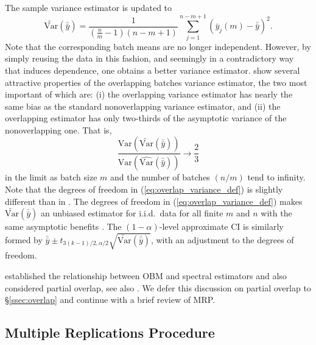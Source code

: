 \documentclass[12pt]{article}
\newcommand{\e}[1]{\mathbb{E} %
#1 %
}
\newcommand{\var}[1]{\mathrm{Var} \left( #1 \right)}
\newcommand{\vart}[1]{\widetilde{\mathrm{Var}} \left( #1 \right)}
\newcommand{\varhat}{\widehat{\mathrm{Var}}}
\newcommand{\X}{X}
\newcommand{\x}{x}
\newcommand{\xh}{{\hat{\x}}}
\newcommand{\xit}{\xi}
\newcommand{\zs}{z^*}
\newcommand{\yb}{\bar{y}}
\newcommand{\ybb}{\bar{\yb}}
\begin{document}
The sample variance estimator is updated to
\begin{equation} \label{eq:overlap_variance_def}
	\vart{\ybb} = \frac{1}{(\tfrac{n}{m}-1)(n - m + 1)}\sum_{j=1}^{n-m+1} (\yb_j(m) - \ybb)^2.
\end{equation}
Note that the corresponding batch means are no longer independent. 
However, by simply reusing the data in this fashion, and seemingly in a contradictory way that induces dependence, one obtains a better variance estimator. 
\citet{Meketon1984} show several attractive properties of the overlapping batches variance estimator, the two most important of which are: (i) the overlapping variance estimator has nearly the same bias as the standard nonoverlapping variance estimator, and (ii) the overlapping estimator has only two-thirds of the asymptotic variance of the nonoverlapping one.  
That is, 
\begin{equation} \label{eq:asym_var}
	\frac{ \var{\vart{\ybb}} }{ \var{\varhat(\ybb)} } \rightarrow \frac{2}{3}
\end{equation}
in the limit as batch size $m$ and the number of batches $(n/m)$ tend to infinity.  
Note that the degrees of freedom in (\ref{eq:overlap_variance_def}) is slightly different than in \citep{Meketon1984}.  
The degrees of freedom in (\ref{eq:overlap_variance_def}) makes $\vart{\ybb}$ an unbiased estimator for i.i.d.\ data for all finite $m$ and $n$ with the same asymptotic benefits \citep{Song1992}.  
The $(1-\alpha)$-level approximate CI is similarly formed by $\ybb \pm t_{3(k-1)/2,\alpha/2} \sqrt{\vart{\ybb}}$, with an adjustment to the degrees of freedom.

\citet{Welch1987} established the relationship between OBM and spectral estimators and also considered partial overlap, see also \citep{Song1992}.  
We defer this discussion on partial overlap to \S \ref{ssec:overlap} and continue with a brief review of MRP.

\subsection{Multiple Replications Procedure} \label{ssec:mrp}

\end{document}
